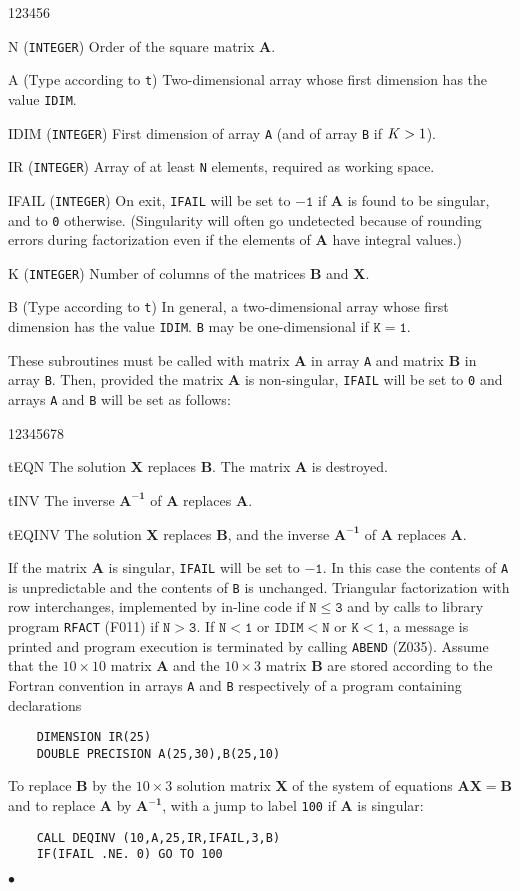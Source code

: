 \begin{DLtt}{123456}
\item [N]  ({\tt INTEGER}) Order of the square matrix {\bf A}.
\item [A] (Type according to {\tt t}) Two-dimensional array
whose first dimension has the value {\tt IDIM}.
\item[IDIM] ({\tt INTEGER}) First dimension of array {\tt A}
(and of array {\tt B} if $ {\tt K > 1}$).
\item [IR] ({\tt INTEGER}) Array of at least {\tt N}
elements, required as working space.
\item[IFAIL]({\tt INTEGER}) On exit, {\tt IFAIL} will be set to
$\mathtt{-1}$ if {\bf A} is found to be singular, and to {\tt 0}
otherwise.
(Singularity will often go undetected because of rounding errors during
factorization even if the elements of {\bf A} have integral values.)
\item [K]({\tt INTEGER}) Number of columns of the matrices
{\bf B} and {\bf X}.
\item [B](Type according to {\tt t}) In general, a two-dimensional
array whose first dimension has the value {\tt IDIM}. {\tt B} may be
one-dimensional if $\mathtt{K = 1}$.
\end{DLtt}
These subroutines must be called with matrix {\bf A} in array {\tt A}
and matrix {\bf B} in array {\tt B}. Then, provided the matrix
{\bf A} is non-singular, {\tt IFAIL} will be set to {\tt 0}
and arrays {\tt A} and {\tt B} will be set as follows:
\begin{DLtt}{12345678}
\item [tEQN] The solution {\bf X} replaces {\bf B}. The matrix
{\bf A} is destroyed.
\item [tINV] The inverse $\mathbf{A^{-1}}$ of {\bf A} replaces {\bf A}.
\item [tEQINV] The solution {\bf X} replaces {\bf B}, and the
inverse $\mathbf{A^{-1}}$ of {\bf A} replaces {\bf A}.
\end{DLtt}
If the matrix {\bf A} is singular, {\tt IFAIL} will be set to
$\mathtt{-1}$. In this case the contents of {\tt A} is unpredictable
and the contents of {\tt B} is unchanged.
\Method
Triangular factorization with row interchanges, implemented by in-line
code if $\mathtt{N \leq 3}$ and by calls to library program {\tt RFACT}
(F011) if $\mathtt{N > 3}$. If $\mathtt{N<1}$ or $\mathtt{IDIM<N}$ or
$\mathtt{K < 1}$, a message is printed and program execution is
terminated by calling {\tt ABEND} (Z035).
\Examples
Assume that the $10 \times 10$ matrix {\bf A} and the $10 \times 3$
matrix {\bf B} are stored according to the Fortran convention in
arrays {\tt A} and {\tt B} respectively of a program containing
declarations
\begin{verbatim}
    DIMENSION IR(25)
    DOUBLE PRECISION A(25,30),B(25,10)
\end{verbatim}
To replace {\bf B} by the $10 \times 3$ solution matrix {\bf X}
of the system of equations $\mathbf{AX=B}$ and to replace {\bf A}
by $\mathbf{A^{-1}}$, with a jump to label {\tt 100} if {\bf A} is
singular:
\begin{verbatim}
    CALL DEQINV (10,A,25,IR,IFAIL,3,B)
    IF(IFAIL .NE. 0) GO TO 100
\end{verbatim}
$\bullet$
